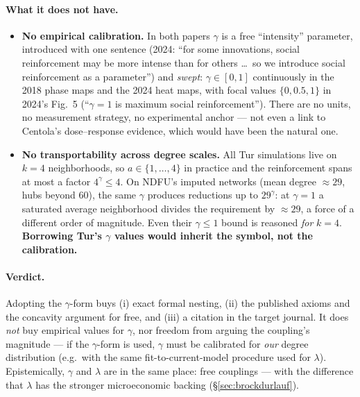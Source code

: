 \documentclass[11pt,a4paper]{article}
\begin{document}
\paragraph{What it does not have.}
\begin{itemize}
  \item \textbf{No empirical calibration.} In both papers $\gamma$ is a free
    ``intensity'' parameter, introduced with one sentence (2024: ``for some innovations,
    social reinforcement may be more intense than for others \dots\ so we introduce
    social reinforcement as a parameter'') and \emph{swept}: $\gamma \in [0,1]$
    continuously in the 2018 phase maps and the 2024 heat maps, with focal values
    $\{0, 0.5, 1\}$ in 2024's Fig.~5 (``$\gamma = 1$ is maximum social reinforcement'').
    There are no units, no measurement strategy, no experimental anchor --- not even a
    link to Centola's dose--response evidence, which would have been the natural one.
  \item \textbf{No transportability across degree scales.} All Tur simulations live on
    $k = 4$ neighborhoods, so $a \in \{1, \dots, 4\}$ in practice and the reinforcement
    spans at most a factor $4^{\gamma} \le 4$. On NDFU's imputed networks (mean degree
    $\approx 29$, hubs beyond 60), the same $\gamma$ produces reductions up to
    $29^{\gamma}$: at $\gamma = 1$ a saturated average neighborhood divides the
    requirement by $\approx 29$, a force of a different order of magnitude. Even their
    $\gamma \le 1$ bound is reasoned \emph{for} $k = 4$. \textbf{Borrowing Tur's
    $\gamma$ values would inherit the symbol, not the calibration.}
\end{itemize}

\paragraph{Verdict.} Adopting the $\gamma$-form buys (i) exact formal nesting, (ii) the
published axioms and the concavity argument for free, and (iii) a citation in the target
journal. It does \emph{not} buy empirical values for $\gamma$, nor freedom from arguing
the coupling's magnitude --- if the $\gamma$-form is used, $\gamma$ must be calibrated
for \emph{our} degree distribution (e.g.\ with the same fit-to-current-model procedure
used for $\lambda$). Epistemically, $\gamma$ and $\lambda$ are in the same place: free
couplings --- with the difference that $\lambda$ has the stronger microeconomic backing
(\S\ref{sec:brockdurlauf}).
\end{document}
